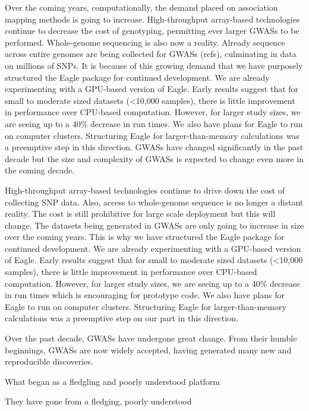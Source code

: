 \documentclass{nature}
\begin{document}
Over the coming years, computationally, the demand placed on association mapping methods is going to increase. 
High-throughput array-based technologies continue to decrease the cost of genotyping, permitting ever larger GWASs to be performed. 
Whole-genome sequencing is also now a reality. Already sequence across entire genomes are being collected for GWASs (refs), 
culminating in data on millions of SNPs. It is because of this growing demand that 
we have purposely structured the Eagle package for continued development. We are already experimenting with a GPU-based version of Eagle. 
Early results suggest that for small to moderate sized datasets (<10,000 samples), there is little improvement in performance over CPU-based 
computation.  However, for larger study sizes, we are seeing up to a 40\% decrease in run times.  
We also have plans for Eagle to run on computer clusters. Structuring Eagle for larger-than-memory calculations was a 
preemptive step in this direction. GWASs have changed significantly in the past decade but the size and complexity of GWASs is expected 
to change even more in the coming decade. 





High-throughput array-based technologies 
continue to drive down the cost of collecting SNP data. Also, access to whole-genome sequence is no longer a distant reality. The cost is still 
prohibitive for large scale deployment but this will change. 
The datasets being generated in GWASs are only going to increase in size over the coming years. 
This is why we have structured the Eagle package for continued development. We are already experimenting with a GPU-based version of Eagle. 
Early results suggest that for small to moderate sized datasets (<10,000 samples), there is little improvement in performance over CPU-based 
computation.  However, for larger study sizes, we are seeing up to a 40\% decrease in run times which is encouraging for prototype code. 
We also have plans for Eagle to run on computer clusters. Structuring Eagle for larger-than-memory calculations was a 
preemptive step on our part in this direction. 

Over the past decade, GWASs have undergone great change. From their humble beginnings, GWASs are now widely accepted, having 
generated many new and reproducible discoveries. 


What began as a fledgling and poorly understood platform 


They have gone from a fledging, poorly understood 
\end{document}
